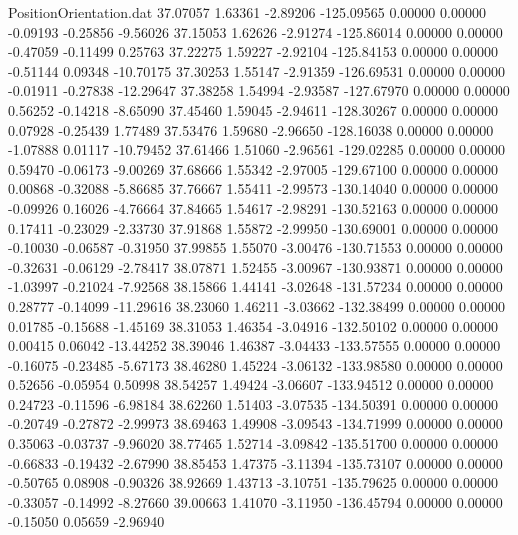 \begin{filecontents}{PositionOrientation.dat}
  37.07057    1.63361   -2.89206  -125.09565    0.00000    0.00000   -0.09193   -0.25856   -9.56026
  37.15053    1.62626   -2.91274  -125.86014    0.00000    0.00000   -0.47059   -0.11499    0.25763
  37.22275    1.59227   -2.92104  -125.84153    0.00000    0.00000   -0.51144    0.09348  -10.70175
  37.30253    1.55147   -2.91359  -126.69531    0.00000    0.00000   -0.01911   -0.27838  -12.29647
  37.38258    1.54994   -2.93587  -127.67970    0.00000    0.00000    0.56252   -0.14218   -8.65090
  37.45460    1.59045   -2.94611  -128.30267    0.00000    0.00000    0.07928   -0.25439    1.77489
  37.53476    1.59680   -2.96650  -128.16038    0.00000    0.00000   -1.07888    0.01117  -10.79452
  37.61466    1.51060   -2.96561  -129.02285    0.00000    0.00000    0.59470   -0.06173   -9.00269
  37.68666    1.55342   -2.97005  -129.67100    0.00000    0.00000    0.00868   -0.32088   -5.86685
  37.76667    1.55411   -2.99573  -130.14040    0.00000    0.00000   -0.09926    0.16026   -4.76664
  37.84665    1.54617   -2.98291  -130.52163    0.00000    0.00000    0.17411   -0.23029   -2.33730
  37.91868    1.55872   -2.99950  -130.69001    0.00000    0.00000   -0.10030   -0.06587   -0.31950
  37.99855    1.55070   -3.00476  -130.71553    0.00000    0.00000   -0.32631   -0.06129   -2.78417
  38.07871    1.52455   -3.00967  -130.93871    0.00000    0.00000   -1.03997   -0.21024   -7.92568
  38.15866    1.44141   -3.02648  -131.57234    0.00000    0.00000    0.28777   -0.14099  -11.29616
  38.23060    1.46211   -3.03662  -132.38499    0.00000    0.00000    0.01785   -0.15688   -1.45169
  38.31053    1.46354   -3.04916  -132.50102    0.00000    0.00000    0.00415    0.06042  -13.44252
  38.39046    1.46387   -3.04433  -133.57555    0.00000    0.00000   -0.16075   -0.23485   -5.67173
  38.46280    1.45224   -3.06132  -133.98580    0.00000    0.00000    0.52656   -0.05954    0.50998
  38.54257    1.49424   -3.06607  -133.94512    0.00000    0.00000    0.24723   -0.11596   -6.98184
  38.62260    1.51403   -3.07535  -134.50391    0.00000    0.00000   -0.20749   -0.27872   -2.99973
  38.69463    1.49908   -3.09543  -134.71999    0.00000    0.00000    0.35063   -0.03737   -9.96020
  38.77465    1.52714   -3.09842  -135.51700    0.00000    0.00000   -0.66833   -0.19432   -2.67990
  38.85453    1.47375   -3.11394  -135.73107    0.00000    0.00000   -0.50765    0.08908   -0.90326
  38.92669    1.43713   -3.10751  -135.79625    0.00000    0.00000   -0.33057   -0.14992   -8.27660
  39.00663    1.41070   -3.11950  -136.45794    0.00000    0.00000   -0.15050    0.05659   -2.96940

\end{filecontents}
